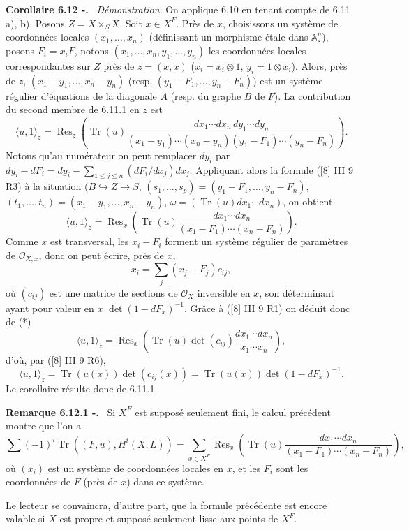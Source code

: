 \documentclass[11pt]{article}
\newenvironment{statement}[1]{\par\medskip\noindent\textbf{#1.}\ }{\par\medskip}
\providecommand{\OO}{\mathcal{O}}
\begin{document}
\begin{statement}{Corollaire 6.12 -}
\emph{Démonstration}. On applique 6.10 en tenant compte de 6.11 a), b). Posons $Z=X\times_S X$. Soit $x\in X^F$. Près de $x$, choisissons un système de coordonnées locales $(x_1,\ldots,x_n)$ (définissant un morphisme étale dans $\mathbb A_s^n$), posons $F_i=x_iF$, notons $(x_1,\ldots,x_n,y_1,\ldots,y_n)$ les coordonnées locales correspondantes sur $Z$ près de $z=(x,x)$ ($x_i=x_i\otimes1$, $y_i=1\otimes x_i$). Alors, près de $z$, $(x_1-y_1,\ldots,x_n-y_n)$ (resp. $(y_1-F_1,\ldots,y_n-F_n)$) est un système régulier d'équations de la diagonale $A$ (resp. du graphe $B$ de $F$). La contribution du second membre de 6.11.1 en $z$ est
\[
\langle u,1\rangle_z=
\operatorname{Res}_z\left(\operatorname{Tr}(u)\frac{dx_1\cdots dx_n\,dy_1\cdots dy_n}{(x_1-y_1)\cdots(x_n-y_n)(y_1-F_1)\cdots(y_n-F_n)}\right).
\]
Notons qu'au numérateur on peut remplacer $dy_i$ par $dy_i-dF_i=dy_i-\sum_{1\le j\le n}(dF_i/dx_j)dx_j$. Appliquant alors la formule ([8] III 9 R3) à la situation $(B\hookrightarrow Z\to S$, $(s_1,\ldots,s_p)=(y_1-F_1,\ldots,y_n-F_n)$, $(t_1,\ldots,t_n)=(x_1-y_1,\ldots,x_n-y_n)$, $\omega=(\operatorname{Tr}(u)dx_1\cdots dx_n)$, on obtient
\begin{equation}
\tag{*}
\langle u,1\rangle_z=
\operatorname{Res}_x\left(\operatorname{Tr}(u)\frac{dx_1\cdots dx_n}{(x_1-F_1)\cdots(x_n-F_n)}\right).
\end{equation}
Comme $x$ est transversal, les $x_i-F_i$ forment un système régulier de paramètres de $\OO_{X,x}$, donc on peut écrire, près de $x$,
\[
x_i=\sum_j(x_j-F_j)c_{ij},
\]
où $(c_{ij})$ est une matrice de sections de $\OO_X$ inversible en $x$, son déterminant ayant pour valeur en $x$ $\det(1-dF_x)^{-1}$. Grâce à ([8] III 9 R1) on déduit donc de (*)
\[
\langle u,1\rangle_z=\operatorname{Res}_x\left(\operatorname{Tr}(u)\det(c_{ij})\frac{dx_1\cdots dx_n}{x_1\cdots x_n}\right),
\]
d'où, par ([8] III 9 R6),
\[
\langle u,1\rangle_z=\operatorname{Tr}(u(x))\det(c_{ij}(x))=\operatorname{Tr}(u(x))\det(1-dF_x)^{-1}.
\]
Le
corollaire résulte donc de 6.11.1.
\end{statement}

\begin{statement}{Remarque 6.12.1 -}
Si $X^F$ est supposé seulement fini, le calcul précédent montre que l'on a
\[
\sum(-1)^i\operatorname{Tr}((F,u),H^i(X,L))=
\sum_{x\in X^F}\operatorname{Res}_x\left(\operatorname{Tr}(u)\frac{dx_1\cdots dx_n}{(x_1-F_1)\cdots(x_n-F_n)}\right),
\]
où $(x_i)$ est un système de coordonnées locales en $x$, et les $F_i$ sont les coordonnées de $F$ (près de $x$) dans ce système.

Le lecteur se convaincra, d'autre part, que la formule précédente est encore valable si $X$ est propre et supposé seulement lisse aux points de $X^F$.
\end{statement}
\end{document}
